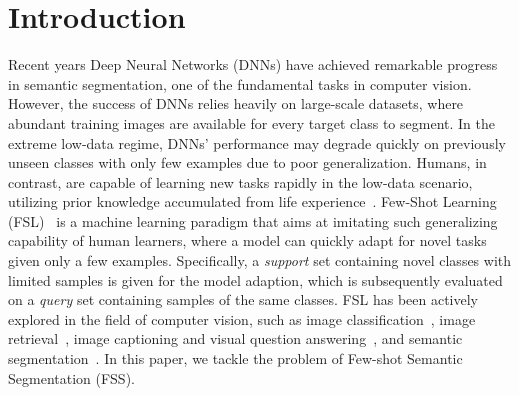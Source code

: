 \documentclass[runningheads,table,xcdraw]{llncs}
\begin{document}
\section{Introduction}
\label{sec:intro}
Recent years
Deep Neural Networks (DNNs) have achieved remarkable progress in semantic segmentation\cite{minaee2021image,taghanaki2021deep}, one of the fundamental tasks in computer vision.
However, the success of DNNs relies heavily on large-scale datasets, where abundant training images are available for every target class to segment.
In the extreme low-data regime, DNNs' performance may degrade quickly on previously unseen classes with only few examples due to poor generalization.
Humans, in contrast, are capable of learning new tasks rapidly in the low-data scenario, utilizing prior knowledge accumulated from life experience~\cite{lake2011Omniglot}.
Few-Shot Learning (FSL)~\cite{fei2006one,fink2005object} is a machine learning paradigm that aims at imitating such generalizing capability of human learners, where a model can quickly adapt for novel tasks given only a few examples.
Specifically, a \textit{support} set containing novel classes with limited samples is given for the model adaption, which is subsequently evaluated on a \textit{query} set containing samples of the same classes.
FSL has been actively explored in the field of computer vision, such as image classification~\cite{vinyals2016matching}, image retrieval~\cite{triantafillou2017few}, image captioning and visual question answering~\cite{dong2018fast}, and semantic segmentation~\cite{dong2018few,liu2020part,lu2021simpler,min2021hypercorrelation,nguyen2019feature,snell2017prototypical,sun2021boosting,tian2020prior,wang2020few,wang2019panet,yang2020prototype,zhang2021self,zhang2019canet,zhang2021few,zhang2020sg}.
In this paper, we tackle the problem of Few-shot Semantic Segmentation (FSS).
\end{document}
